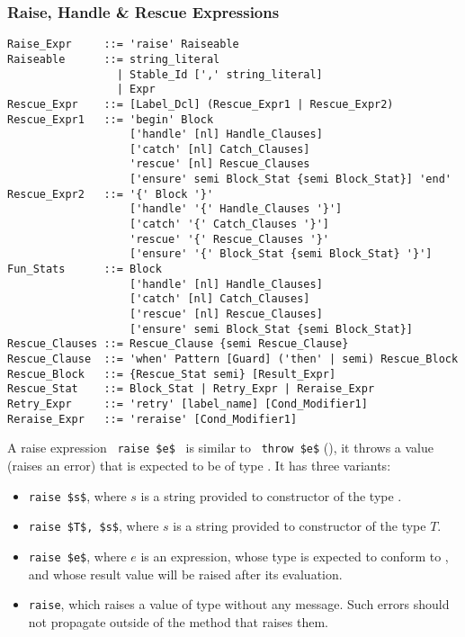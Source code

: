 \subsubsection{Raise, Handle \& Rescue Expressions}

\grammar\begin{lstlisting}
Raise_Expr     ::= 'raise' Raiseable
Raiseable      ::= string_literal
                 | Stable_Id [',' string_literal]
                 | Expr
Rescue_Expr    ::= [Label_Dcl] (Rescue_Expr1 | Rescue_Expr2)
Rescue_Expr1   ::= 'begin' Block 
                   ['handle' [nl] Handle_Clauses]
                   ['catch' [nl] Catch_Clauses]
                   'rescue' [nl] Rescue_Clauses
                   ['ensure' semi Block_Stat {semi Block_Stat}] 'end'
Rescue_Expr2   ::= '{' Block '}' 
                   ['handle' '{' Handle_Clauses '}']
                   ['catch' '{' Catch_Clauses '}']
                   'rescue' '{' Rescue_Clauses '}'
                   ['ensure' '{' Block_Stat {semi Block_Stat} '}']
Fun_Stats      ::= Block
                   ['handle' [nl] Handle_Clauses]
                   ['catch' [nl] Catch_Clauses]
                   ['rescue' [nl] Rescue_Clauses]
                   ['ensure' semi Block_Stat {semi Block_Stat}]
Rescue_Clauses ::= Rescue_Clause {semi Rescue_Clause}
Rescue_Clause  ::= 'when' Pattern [Guard] ('then' | semi) Rescue_Block
Rescue_Block   ::= {Rescue_Stat semi} [Result_Expr]
Rescue_Stat    ::= Block_Stat | Retry_Expr | Reraise_Expr
Retry_Expr     ::= 'retry' [label_name] [Cond_Modifier1]
Reraise_Expr   ::= 'reraise' [Cond_Modifier1]
\end{lstlisting}

A raise expression ~\lstinline!raise $e$!~ is similar to ~\lstinline!throw $e$! (), it throws a value (raises an error) that is expected to be of type . It has three variants: 
\begin{itemize}
\item[] \lstinline!raise $s$!, where $s$ is a string provided to constructor of the type . 
\item[] \lstinline!raise $T$, $s$!, where $s$ is a string provided to constructor of the type $T$. 
\item[] \lstinline!raise $e$!, where $e$ is an expression, whose type is expected to conform to , and whose result value will be raised after its evaluation. 
\item[] \lstinline!raise!, which raises a value of type  without any message. Such errors should not propagate outside of the method that raises them. 
\end{itemize}

